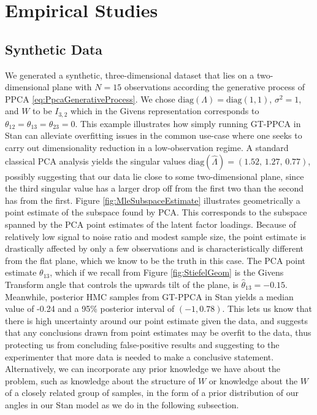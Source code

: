 \documentclass{article}
\begin{document}
\section{Empirical Studies} \label{examples}

\subsection{Synthetic Data}
We generated a synthetic, three-dimensional dataset that lies on a two-dimensional plane with $N =15$ observations according the generative process of PPCA \ref{eq:PpcaGenerativeProcess}. We chose $\mathrm{diag}(\Lambda) =\mathrm{diag}(1, 1)$, $\sigma^2 = 1$, and $W$ to be $I_{3,2}$ which in the Givens representation corresponds to $\theta_{12} = \theta_{13} = \theta_{23} = 0$. This example illustrates how simply running GT-PPCA in Stan can alleviate overfitting issues in the common use-case where one seeks to carry out dimensionality reduction in a low-observation regime. A standard classical PCA analysis yields the singular values $\mathrm{diag}(\hat{\Lambda}) = (1.52,\, 1.27,\, 0.77)$,  possibly suggesting that our data lie close to some two-dimensional plane, since the third singular value has a larger drop off from the first two than the second has from the first. Figure \ref{fig:MleSubspaceEstimate} illustrates geometrically a point estimate of the subspace found by PCA. This corresponds to the subspace spanned by the PCA point estimates of the latent factor loadings. Because of relatively low signal to noise ratio and modest sample size, the point estimate is drastically affected by only a few observations and is characteristically different from the flat plane, which we know to be the truth in this case. The PCA point estimate $\theta_{13}$, which if we recall from Figure \ref{fig:StiefelGeom} is the Givens Transform angle that controls the upwards tilt of the plane, is $\hat{\theta}_{13} = -0.15$. Meanwhile, posterior HMC samples from GT-PPCA in Stan yields a median value of -0.24 and a 95\% posterior interval of $(-1, 0.78)$. This lets us know that there is high uncertainty around our point estimate given the data, and suggests that any conclusions drawn from point estimates may be overfit to the data, thus protecting us from concluding false-positive results and suggesting to the experimenter that more data is needed to make a conclusive statement. Alternatively, we can incorporate any prior knowledge we have about the problem, such as knowledge about the structure of $W$ or knowledge about the $W$ of a closely related group of samples, in the form of a prior distribution of our angles in our Stan model as we do in the following subsection.
\end{document}
